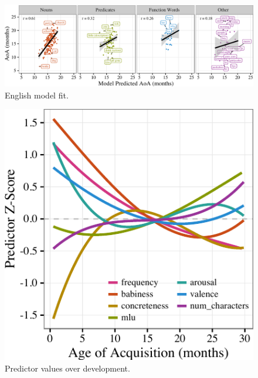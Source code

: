\documentclass[10pt, letterpaper]{article}
\newenvironment{CodeChunk}{}{}
\begin{document}
\begin{CodeChunk}
\begin{figure}[tb]

{\centering \includegraphics{figs/fit-1} 

}

\caption[English model fit]{English model fit.}\label{fig:fit}
\end{figure}
\end{CodeChunk}

\begin{CodeChunk}
\begin{figure}[!hb]

{\centering \includegraphics{figs/devo-1} 

}

\caption[Predictor values over development]{Predictor values over development.}\label{fig:devo}
\end{figure}
\end{CodeChunk}
\end{document}
